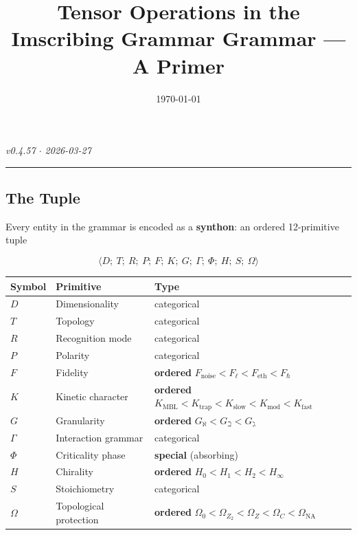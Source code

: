\documentclass[12pt,a4paper]{article}
\begin{document}
\title{Tensor Operations in the Imscribing Grammar Grammar --- A Primer}
\date{\today}

\maketitle

\emph{v0.4.57 $\cdot$ 2026-03-27}

\begin{center}
\rule{0.5\textwidth}{0.4pt}
\end{center}

\subsection{The Tuple}

Every entity in the grammar is encoded as a \textbf{synthon}: an ordered 12-primitive tuple

\[\langle D;\ T;\ R;\ P;\ F;\ K;\ G;\ \Gamma;\ \Phi;\ H;\ S;\ \Omega \rangle\]

\begin{table}[htbp]
\centering
\small
{}
\begin{tabularx}{\textwidth}{>{\centering\arraybackslash}X >{\centering\arraybackslash}X >{\centering\arraybackslash}X}
\toprule
\rowcolor{gray!25}\textbf{Symbol} & \textbf{Primitive} & \textbf{Type} \\
\midrule
\rowcolors{1}{white}{gray!10}
$D$ & Dimensionality & categorical \\
$T$ & Topology & categorical \\
$R$ & Recognition mode & categorical \\
$P$ & Polarity & categorical \\
$F$ & Fidelity & \textbf{ordered} $F_\text{noise} < F_{\ell} < F_\text{eth} < F_{\hbar}$ \\
$K$ & Kinetic character & \textbf{ordered} $K_\text{MBL} < K_\text{trap} < K_\text{slow} < K_\text{mod} < K_\text{fast}$ \\
$G$ & Granularity & \textbf{ordered} $G_{\aleph} < G_{\beth} < G_{\gimel}$ \\
$\Gamma$ & Interaction grammar & categorical \\
$\Phi$ & Criticality phase & \textbf{special} (absorbing) \\
$H$ & Chirality & \textbf{ordered} $H_0 < H_1 < H_2 < H_{\infty}$ \\
$S$ & Stoichiometry & categorical \\
$\Omega$ & Topological protection & \textbf{ordered} $\Omega_0 < \Omega_{Z_2} < \Omega_Z < \Omega_C < \Omega_\text{NA}$ \\
\bottomrule
\end{tabularx}
\end{table}
\end{document}
